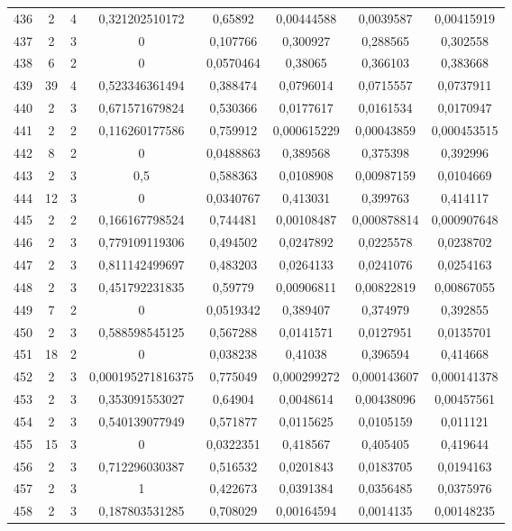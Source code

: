 \begin{longtable}{|c|c|c|c|c|c|c|c|}
436 & 2 & 4 & 0,321202510172 & 0,65892 & 0,00444588 & 0,0039587 & 0,00415919  \\
437 & 2 & 3 & 0 & 0,107766 & 0,300927 & 0,288565 & 0,302558  \\
438 & 6 & 2 & 0 & 0,0570464 & 0,38065 & 0,366103 & 0,383668  \\
439 & 39 & 4 & 0,523346361494 & 0,388474 & 0,0796014 & 0,0715557 & 0,0737911  \\
440 & 2 & 3 & 0,671571679824 & 0,530366 & 0,0177617 & 0,0161534 & 0,0170947  \\
441 & 2 & 2 & 0,116260177586 & 0,759912 & 0,000615229 & 0,00043859 & 0,000453515  \\
442 & 8 & 2 & 0 & 0,0488863 & 0,389568 & 0,375398 & 0,392996  \\
443 & 2 & 3 & 0,5 & 0,588363 & 0,0108908 & 0,00987159 & 0,0104669  \\
444 & 12 & 3 & 0 & 0,0340767 & 0,413031 & 0,399763 & 0,414117  \\
445 & 2 & 2 & 0,166167798524 & 0,744481 & 0,00108487 & 0,000878814 & 0,000907648  \\
446 & 2 & 3 & 0,779109119306 & 0,494502 & 0,0247892 & 0,0225578 & 0,0238702  \\
447 & 2 & 3 & 0,811142499697 & 0,483203 & 0,0264133 & 0,0241076 & 0,0254163  \\
448 & 2 & 3 & 0,451792231835 & 0,59779 & 0,00906811 & 0,00822819 & 0,00867055  \\
449 & 7 & 2 & 0 & 0,0519342 & 0,389407 & 0,374979 & 0,392855  \\
450 & 2 & 3 & 0,588598545125 & 0,567288 & 0,0141571 & 0,0127951 & 0,0135701  \\
451 & 18 & 2 & 0 & 0,038238 & 0,41038 & 0,396594 & 0,414668  \\
452 & 2 & 3 & 0,000195271816375 & 0,775049 & 0,000299272 & 0,000143607 & 0,000141378  \\
453 & 2 & 3 & 0,353091553027 & 0,64904 & 0,0048614 & 0,00438096 & 0,00457561  \\
454 & 2 & 3 & 0,540139077949 & 0,571877 & 0,0115625 & 0,0105159 & 0,011121  \\
455 & 15 & 3 & 0 & 0,0322351 & 0,418567 & 0,405405 & 0,419644  \\
456 & 2 & 3 & 0,712296030387 & 0,516532 & 0,0201843 & 0,0183705 & 0,0194163  \\
457 & 2 & 3 & 1 & 0,422673 & 0,0391384 & 0,0356485 & 0,0375976  \\
458 & 2 & 3 & 0,187803531285 & 0,708029 & 0,00164594 & 0,0014135 & 0,00148235  \\

\end{longtable}
